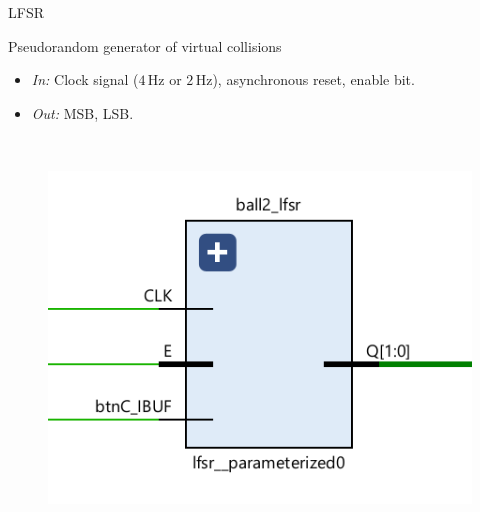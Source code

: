 \documentclass[aspectratio=169, 11pt, hyperref={unicode}]{beamer}
\def\Hz{\,\mathrm{Hz}}
\begin{document}
\begin{frame}{LFSR}
    \begin{minipage}{.45\textwidth}
        Pseudorandom generator of virtual collisions
        \begin{itemize}
            \item \emph{In:} Clock signal ($4\Hz$ or $2\Hz$), asynchronous reset, enable bit.
            \item \emph{Out:} MSB, LSB.
        \end{itemize}
    \end{minipage}
    ~
    \begin{minipage}{.45\textwidth}
        \begin{figure}[!ht]
            \centering
            \includegraphics[width=\textwidth]{src/lfsr.png}
        \end{figure}
    \end{minipage}
\end{frame}
\end{document}
